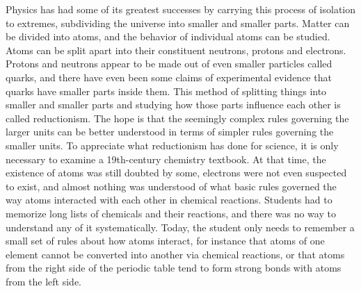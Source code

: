 \enlargethispage{-2\baselineskip}

Physics has had some of its greatest successes by carrying
this process of isolation to extremes, subdividing the
universe into smaller and smaller parts. Matter can be
divided into atoms, and the behavior of individual atoms can
be studied. Atoms can be split apart into their constituent
neutrons, protons and electrons. Protons and neutrons appear
to be made out of even smaller particles called quarks, and
there have even been some claims of experimental evidence
that quarks have smaller parts inside them. This method of
splitting things into smaller and smaller parts and studying
how those parts influence each other is called reductionism.
The hope is that the seemingly complex rules governing the
larger units can be better understood in terms of simpler
rules governing the smaller units. To appreciate what
reductionism has done for science, it is only necessary to
examine a 19th-century chemistry textbook. At that time, the
existence of atoms was still doubted by some, electrons were
not even suspected to exist, and almost nothing was
understood of what basic rules governed the way atoms
interacted with each other in chemical reactions. Students
had to memorize long lists of chemicals and their reactions,
and there was no way to understand any of it systematically.
Today, the student only needs to remember a small set of
rules about how atoms interact, for instance that atoms of
one element cannot be converted into another via chemical
reactions, or that atoms from the right side of the periodic
table tend to form strong bonds with atoms from the left side.

\enlargethispage{-2\baselineskip}




